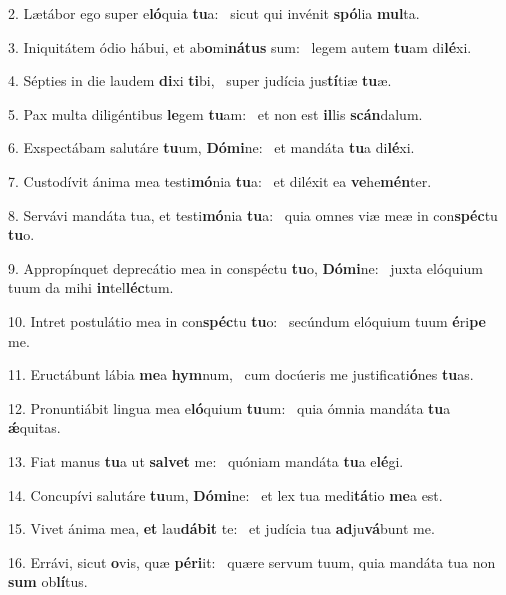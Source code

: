 2. Lætábor ego super e\textbf{ló}quia \textbf{tu}a: \ast\  sicut qui invénit \textbf{spó}lia \textbf{mul}ta.\

3. Iniquitátem ódio hábui, et ab\textbf{o}mi\textbf{ná}\textbf{tus} sum: \ast\  legem autem \textbf{tu}am di\textbf{lé}xi.\

4. Sépties in die laudem \textbf{di}xi \textbf{ti}bi, \ast\  super judícia jus\textbf{tí}tiæ \textbf{tu}æ.\

5. Pax multa diligéntibus \textbf{le}gem \textbf{tu}am: \ast\  et non est \textbf{il}lis \textbf{scán}dalum.\

6. Exspectábam salutáre \textbf{tu}um, \textbf{Dó}\textbf{mi}ne: \ast\  et mandáta \textbf{tu}a di\textbf{lé}xi.\

7. Custodívit ánima mea testi\textbf{mó}nia \textbf{tu}a: \ast\  et diléxit ea \textbf{ve}he\textbf{mén}ter.\

8. Servávi mandáta tua, et testi\textbf{mó}nia \textbf{tu}a: \ast\  quia omnes viæ meæ in con\textbf{spéc}tu \textbf{tu}o.\

9. Appropínquet deprecátio mea in conspéctu \textbf{tu}o, \textbf{Dó}\textbf{mi}ne: \ast\  juxta elóquium tuum da mihi \textbf{in}tel\textbf{léc}tum.\

10. Intret postulátio mea in con\textbf{spéc}tu \textbf{tu}o: \ast\  secúndum elóquium tuum \textbf{é}ri\textbf{pe} me.\

11. Eructábunt lábia \textbf{me}a \textbf{hym}num, \ast\  cum docúeris me justificati\textbf{ó}nes \textbf{tu}as.\

12. Pronuntiábit lingua mea e\textbf{ló}quium \textbf{tu}um: \ast\  quia ómnia mandáta \textbf{tu}a \textbf{ǽ}quitas.\

13. Fiat manus \textbf{tu}a ut \textbf{sal}\textbf{vet} me: \ast\  quóniam mandáta \textbf{tu}a e\textbf{lé}gi.\

14. Concupívi salutáre \textbf{tu}um, \textbf{Dó}\textbf{mi}ne: \ast\  et lex tua medi\textbf{tá}tio \textbf{me}a est.\

15. Vivet ánima mea, \textbf{et} lau\textbf{dá}\textbf{bit} te: \ast\  et judícia tua \textbf{ad}ju\textbf{vá}bunt me.\

16. Errávi, sicut \textbf{o}vis, quæ \textbf{pér}\textbf{i}it: \ast\  quære servum tuum, quia mandáta tua non \textbf{sum} ob\textbf{lí}tus.\

